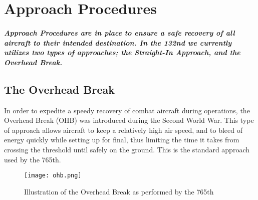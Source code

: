 \chapter{Approach Procedures}
  	\paragraph{
  		Approach Procedures are in place to ensure a safe recovery of all aircraft to their intended destination. In the 132nd we currently utilizes two types of approaches; the Straight-In Approach, and the Overhead Break.
  }

	\section{The Overhead Break}
  		\textnormal{
  			In order to expedite a speedy recovery of combat aircraft during operations, the Overhead Break (OHB) was introduced during the Second World War. This type of approach allows aircraft to keep a relatively high air speed, and to bleed of energy quickly while setting up for final, thus limiting the time it takes from crossing the threshold until safely on the ground. This is the standard approach used by the 765th. \\
  }
  
	\begin{figure}[!ht]
  		\texttt{[image: ohb.png]}
    		\label{ohb_fig}
    		\caption{Illustration of the Overhead Break as performed by the 765th}
  	\end{figure}